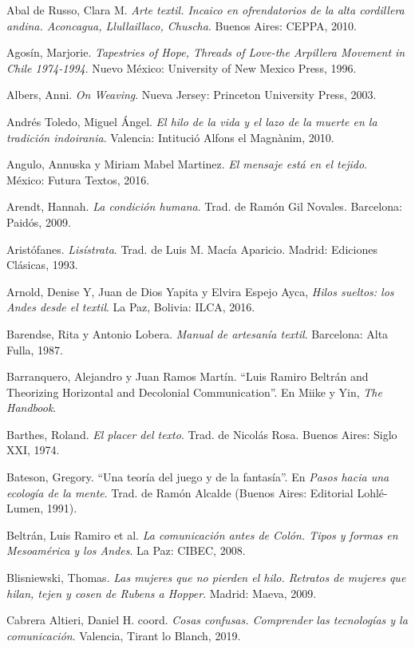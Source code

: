 \documentclass{tufte-handout}
\begin{document}
\begin{hangparas}{.25in}{1} 



Abal de Russo, Clara M. \emph{Arte textil. Incaico en ofrendatorios de
la alta cordillera andina. Aconcagua, Llullaillaco, Chuscha}. Buenos
Aires: CEPPA, 2010.

Agosín, Marjorie. \emph{Tapestries of Hope, Threads of Love-the
Arpillera Movement in Chile 1974-1994}. Nuevo México: University of New
Mexico Press, 1996.

Albers, Anni. \emph{On Weaving}. Nueva Jersey: Princeton University
Press, 2003.

Andrés Toledo, Miguel Ángel. \emph{El hilo de la vida y el lazo de la
muerte en la tradición indoirania}. Valencia: Intitució Alfons el
Magnànim, 2010.

Angulo, Annuska y Miriam Mabel Martinez. \emph{El mensaje está en el
tejido}. México: Futura Textos, 2016.

Arendt, Hannah. \emph{La condición humana}. Trad. de Ramón Gil Novales.
Barcelona: Paidós, 2009.

Aristófanes. \emph{Lisístrata}. Trad. de Luis M. Macía Aparicio. Madrid:
Ediciones Clásicas, 1993.

Arnold, Denise Y, Juan de Dios Yapita y Elvira Espejo Ayca, \emph{Hilos
sueltos: los Andes desde el textil}. La Paz, Bolivia: ILCA, 2016.

Barendse, Rita y Antonio Lobera. \emph{Manual de artesanía textil}.
Barcelona: Alta Fulla, 1987.

Barranquero, Alejandro y Juan Ramos Martín. ``Luis Ramiro Beltrán and
Theorizing Horizontal and Decolonial Communication''. En Miike y Yin,
\emph{The Handbook}.

Barthes, Roland. \emph{El placer del texto}. Trad. de Nicolás Rosa.
Buenos Aires: Siglo XXI, 1974.

Bateson, Gregory. ``Una teoría del juego y de la fantasía''. En
\emph{Pasos hacia una ecología de la mente}. Trad. de Ramón Alcalde
(Buenos Aires: Editorial Lohlé-Lumen, 1991).

Beltrán, Luis Ramiro et al. \emph{La comunicación antes de Colón. Tipos
y formas en Mesoamérica y los Andes}. La Paz: CIBEC, 2008.

Blisniewski, Thomas. \emph{Las mujeres que no pierden el hilo. Retratos
de mujeres que hilan, tejen y cosen de Rubens a Hopper}. Madrid: Maeva,
2009.

Cabrera Altieri, Daniel H. coord. \emph{Cosas confusas. Comprender las
tecnologías y la comunicación}. Valencia, Tirant lo Blanch, 2019.


\end{hangparas}
\end{document}
